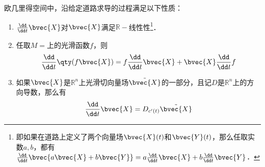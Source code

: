 欧几里得空间中，沿给定道路求导的过程满足以下性质：
\begin{enumerate}
\item $\frac{\dd }{\dd t}\bvec{X}$对$\bvec{X}$满足$\mathbb{R}-$线性性\footnote{即如果在道路上定义了两个向量场$\bvec{X}(t)$和$\bvec{Y}(t)$，那么任取实数$a, b$，都有$\frac{\dd}{\dd t}\bvec{a\bvec{X}+b\bvec{Y}}=a\frac{\dd}{\dd t}\bvec{X}+b\frac{\dd}{\dd t}\bvec{Y}$．}．
\item 任取$M=$上的光滑函数$f$，则
\begin{equation}
\frac{\dd}{\dd t}\qty(f\bvec{X})=f\frac{\dd}{\dd t}\bvec{X}+\bvec{X}\frac{\dd}{\dd t}f
\end{equation}
\item 如果$\bvec{X}$是$\mathbb{R}^n$上光滑切向量场$\tilde{\bvec{X}}$的一部分，且记$D$是$\mathbb{R}^n$上的方向导数，那么有
\begin{equation}\label{CoDer_eq4}
\frac{\dd}{\dd t}\bvec{X}=D_{c'(t)}\tilde{\bvec{X}}
\end{equation}

\end{enumerate}



















